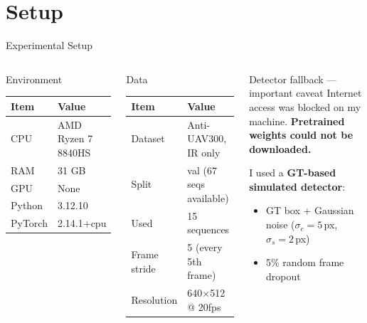 \documentclass[aspectratio=169, 10pt]{beamer}
\begin{document}
\section{Setup}

\begin{frame}{Experimental Setup}

  \begin{columns}[T]

    \begin{block}{Environment}
      \begin{tabular}{ll}
        \toprule
        Item & Value \\
        \midrule
        CPU    & AMD Ryzen 7 8840HS \\
        RAM    & 31 GB \\
        GPU    & None \\
        Python & 3.12.10 \\
        PyTorch & 2.14.1+cpu \\
        \bottomrule
      \end{tabular}
    \end{block}

    \vspace{0.5em}
    \begin{block}{Data}
      \begin{tabular}{ll}
        \toprule
        Item & Value \\
        \midrule
        Dataset    & Anti-UAV300, IR only \\
        Split      & val (67 seqs available) \\
        Used       & 15 sequences \\
        Frame stride & 5 (every 5th frame) \\
        Resolution & 640$\times$512 @ 20fps \\
        \bottomrule
      \end{tabular}
    \end{block}

    \begin{alertblock}{Detector fallback — important caveat}
      Internet access was blocked on my machine.
      \textbf{Pretrained weights could not be downloaded.}

      \vspace{0.5em}
      I used a \textbf{GT-based simulated detector}:
      \begin{itemize}
        \item GT box + Gaussian noise ($\sigma_c{=}5$\,px, $\sigma_s{=}2$\,px)
        \item 5\% random frame dropout
      \end{itemize}


\end{alertblock}
\end{columns}
\end{frame}
\end{document}
